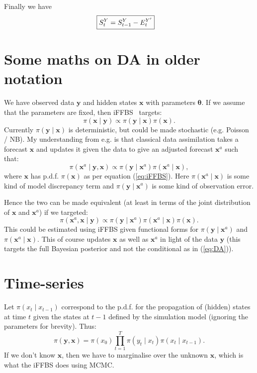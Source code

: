 \documentclass[a4paper]{article}
\newcommand{\btheta}{\bm{\theta}}
\newcommand{\bx}{\bm{x}}
\newcommand{\by}{\bm{y}}
\begin{document}
Finally we have
\begin{align*}
    \Aboxed{S^Y_t &= S^Y_{t - 1} - E^{Y^\prime}_t}
\end{align*}

\section*{Some maths on DA in older notation}

We have observed data $\by$ and hidden states $\bx$ with parameters $\btheta$. If we assume that the parameters are fixed, then iFFBS~\citep{touloupouetal:2020} targets:
\begin{equation}
    \pi\left(\bx \mid \by\right) \propto \pi\left(\by \mid \bx\right)\pi\left(\bx\right). \label{eq:iFFBS}
\end{equation}
Currently $\pi\left(\by \mid \bx\right)$ is deterministic, but could be made stochastic (e.g. Poisson / NB). My understanding from e.g. \cite{lahoz_schneider:2014} is that classical data assimilation takes a forecast $\bx$ and updates it given the data to give an adjusted forecast $\bx^a$ such that:
\begin{equation}
    \pi\left(\bx^a \mid \by, \bx\right) \propto \pi\left(\by \mid \bx^a\right)\pi\left(\bx^a \mid \bx\right), \label{eq:DA}
\end{equation}
where $\bx$ has p.d.f. $\pi\left(\bx\right)$ as per equation (\ref{eq:iFFBS}). Here $\pi\left(\bx^a \mid \bx\right)$ is some kind of model discrepancy term and $\pi\left(\by \mid \bx^a\right)$ is some kind of observation error. 

Hence the two can be made equivalent (at least in terms of the joint distribution of $\bx$ and $\bx^a$) if we targeted:
\begin{equation}
    \pi\left(\bx^a, \bx \mid \by\right) \propto \pi\left(\by \mid \bx^a\right)\pi\left(\bx^a \mid \bx\right)\pi\left(\bx\right). \label{eq:joint}
\end{equation}
This could be estimated using iFFBS given functional forms for $\pi\left(\by \mid \bx^a\right)$ and $\pi\left(\bx^a \mid \bx\right)$. This of course updates $\bx$ as well as $\bx^a$ in light of the data $\by$ (this targets the full Bayesian posterior and not the conditional as in (\ref{eq:DA})).

\section{Time-series}
Let $\pi\left(x_t \mid x_{t-1}\right)$ correspond to the p.d.f. for the propagation of (hidden) states at time $t$ given the states at $t-1$ defined by the simulation model (ignoring the parameters for brevity). Thus:
\begin{equation}
    \pi\left(\by, \bx\right) = \pi\left(x_0\right)\prod_{t=1}^T \pi\left(y_t \mid x_t\right)\pi\left(x_t \mid x_{t - 1}\right).
\end{equation}
If we don't know $\bx$, then we have to marginalise over the unknown $\bx$, which is what the iFFBS does using MCMC.
\end{document}
